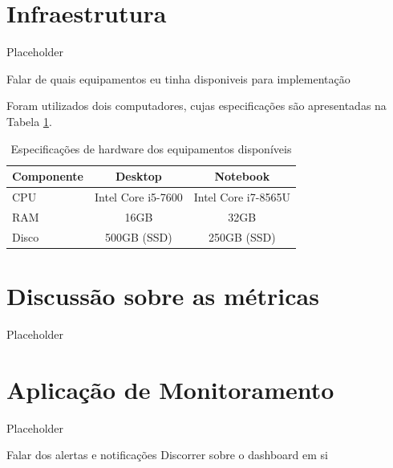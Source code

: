 \section{Infraestrutura}

Placeholder

Falar de quais equipamentos eu tinha disponiveis para implementação

Foram utilizados dois computadores, cujas especificações são apresentadas na Tabela \ref{tab:available-hardware}.

\begin{table}[H]
\centering
\caption{Especificações de hardware dos equipamentos disponíveis}
\label{tab:available-hardware}
\begin{tabular}{lcc}
\toprule
\textbf{Componente} & \textbf{Desktop} & \textbf{Notebook} \\
\midrule
CPU   & Intel Core i5-7600   & Intel Core i7-8565U \\
RAM   & 16GB                 & 32GB                \\
Disco & 500GB (SSD)            & 250GB (SSD)          \\
\bottomrule
\end{tabular}
\end{table}



\section{Discussão sobre as métricas}

Placeholder

\section{Aplicação de Monitoramento}

Placeholder

Falar dos alertas e notificações
Discorrer sobre o dashboard em si